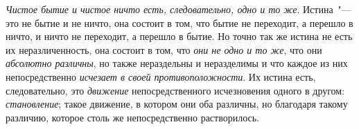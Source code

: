 \emph{Чистое бытие и чистое ничто есть, следовательно,
одно и то же}. Истина~"--- это не бытие и не ничто, она
состоит в том, что бытие не переходит, а перешло в ничто,
и ничто не переходит, а перешло в бытие. Но точно так
же истина не есть их неразличенность, она состоит в том,
что \emph{они не одно и то же}, что они \emph{абсолютно различны},
но также нераздельны и неразделимы и что каждое из
них непосредственно \emph{исчезает в своей противоположности}.
Их истина есть, следовательно, это \emph{движение} непосредственного
исчезновения одного в другом: \emph{становление};
такое движение, в котором они оба различны, но
благодаря такому различию, которое столь же непосредственно
растворилось.

